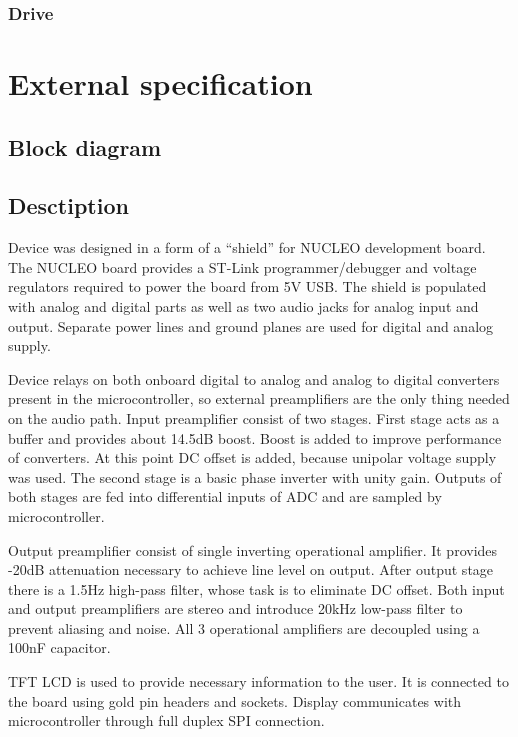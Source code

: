 \documentclass[a4paper,twoside,12pt]{book}
\begin{document}
\subsection{Drive}




\chapter{External specification}

\section{Block diagram}

\section{Desctiption}
Device was designed in a form of a “shield” for NUCLEO development board.
The NUCLEO board provides a ST-Link programmer/debugger
and voltage regulators required to power the board from 5V USB.
The shield is populated with analog and digital parts
as well as two audio jacks for analog input and output.
Separate power lines and ground planes are used for digital and analog supply.

Device relays on both onboard digital to analog
and analog to digital converters present in the microcontroller,
so external preamplifiers are the only thing needed on the audio path.
Input preamplifier consist of two stages.
First stage acts as a buffer and provides about 14.5dB boost.
Boost is added to improve performance of converters.
At this point DC offset is added, because unipolar voltage supply was used.
The second stage is a basic phase inverter with unity gain.
Outputs of both stages are fed into differential inputs of ADC
and are sampled by microcontroller.

Output preamplifier consist of single inverting operational amplifier.
It provides -20dB attenuation necessary to achieve line level on output.
After output stage there is a 1.5Hz high-pass filter,
whose task is to eliminate DC offset.
Both input and output preamplifiers are stereo and introduce 20kHz low-pass filter
to prevent aliasing and noise.
All 3 operational amplifiers are decoupled using a 100nF capacitor.

TFT LCD is used to provide necessary information to the user.
It is connected to the board using gold pin headers and sockets.
Display communicates with microcontroller through full duplex SPI connection.
\end{document}
